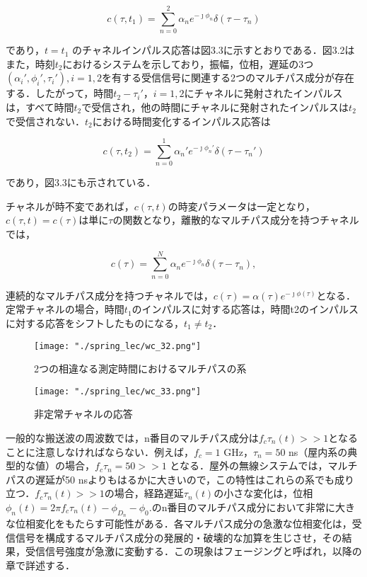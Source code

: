 \documentclass[dvipdfmx]{jsarticle}
\begin{document}
\begin{equation}\label{3.8}
c(\tau, t_1) = \sum_{n=0}^{2} \alpha_n e^{- \jmath \phi_n} \delta(\tau - \tau_n) \tag{3.8}
\end{equation}

\noindent
であり，$t = t_1$ のチャネルインパルス応答は図3.3に示すとおりである．図3.2はまた，時刻$t_2$におけるシステムを示しており，振幅，位相，遅延の3つ$(\alpha_i', \phi_i', \tau_i'), i = 1, 2$を有する受信信号に関連する2つのマルチパス成分が存在する．したがって，時間$t_2 - \tau_i'，i = 1, 2$にチャネルに発射されたインパルスは，すべて時間$t_2$で受信され，他の時間にチャネルに発射されたインパルスは$t_2$で受信されない．$t_2$における時間変化するインパルス応答は

\begin{equation}\label{3.9}
c(\tau, t_2) = \sum_{n=0}^{1} \alpha_n' e^{- \jmath \phi_n'} \delta(\tau - \tau_n') \tag{3.9}
\end{equation}

\noindent
であり，図3.3にも示されている．

チャネルが時不変であれば，$c(\tau, t)$の時変パラメータは一定となり，$c(\tau, t) = c(\tau)$は単に$\tau$の関数となり，離散的なマルチパス成分を持つチャネルでは，

\begin{equation}\label{3.10}
c(\tau) = \sum_{n=0}^{N} \alpha_n e^{- \jmath \phi_n} \delta(\tau - \tau_n), \tag{3.10}
\end{equation}

\noindent
連続的なマルチパス成分を持つチャネルでは，$c(\tau) = \alpha(\tau)e^{- \jmath \phi(\tau)}$となる．定常チャネルの場合，時間$t_1$のインパルスに対する応答は，時間t2のインパルスに対する応答をシフトしたものになる，$t_1 \neq t_2$．

\begin{figure}[htbp]
\begin{center}
\texttt{[image: "./spring\_lec/wc\_32.png"]}
\end{center}
\caption{2つの相違なる測定時間におけるマルチパスの系}
\end{figure}

\begin{figure}[H]
\begin{center}
\texttt{[image: "./spring\_lec/wc\_33.png"]}
\end{center}
\caption{非定常チャネルの応答}
\end{figure}

一般的な搬送波の周波数では，n番目のマルチパス成分は$f_{c}\tau_n (t) >> 1$となることに注意しなければならない．例えば，$f_c = 1$ GHz，$\tau_n = 50$ ns（屋内系の典型的な値）の場合，$f_{c}\tau_n = 50 >> 1$ となる．屋外の無線システムでは，マルチパスの遅延が50 nsよりもはるかに大きいので，この特性はこれらの系でも成り立つ．$f_{c}\tau_n (t) >> 1$の場合，経路遅延$\tau_n (t)$の小さな変化は，位相$\phi_n (t) = 2\pi f_c \tau_n (t) - \phi_{D_n} - \phi_0 .$のn番目のマルチパス成分において非常に大きな位相変化をもたらす可能性がある．各マルチパス成分の急激な位相変化は，受信信号を構成するマルチパス成分の発展的・破壊的な加算を生じさせ，その結果，受信信号強度が急激に変動する．この現象はフェージングと呼ばれ，以降の章で詳述する．
\end{document}
